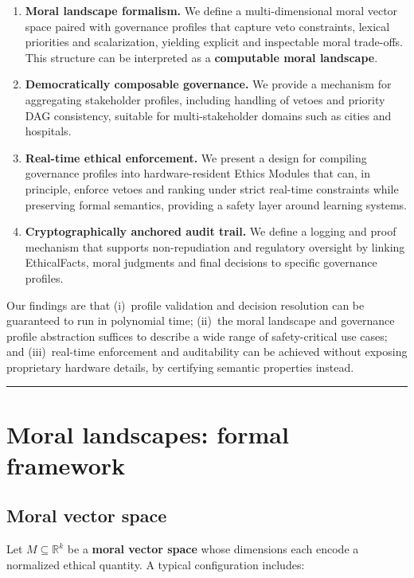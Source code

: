 \documentclass[11pt]{article}
\begin{document}
\begin{enumerate}
  \item \textbf{Moral landscape formalism.} We define a multi-dimensional moral vector space paired with governance profiles that capture veto constraints, lexical priorities and scalarization, yielding explicit and inspectable moral trade-offs. This structure can be interpreted as a \textbf{computable moral landscape}.
  \item \textbf{Democratically composable governance.} We provide a mechanism for aggregating stakeholder profiles, including handling of vetoes and priority DAG consistency, suitable for multi-stakeholder domains such as cities and hospitals.
  \item \textbf{Real-time ethical enforcement.} We present a design for compiling governance profiles into hardware-resident Ethics Modules that can, in principle, enforce vetoes and ranking under strict real-time constraints while preserving formal semantics, providing a safety layer around learning systems.
  \item \textbf{Cryptographically anchored audit trail.} We define a logging and proof mechanism that supports non-repudiation and regulatory oversight by linking EthicalFacts, moral judgments and final decisions to specific governance profiles.
\end{enumerate}

Our findings are that (i)~profile validation and decision resolution can be guaranteed to run in polynomial time; (ii)~the moral landscape and governance profile abstraction suffices to describe a wide range of safety-critical use cases; and (iii)~real-time enforcement and auditability can be achieved without exposing proprietary hardware details, by certifying semantic properties instead.

\hrule
\vspace{1em}

\section{Moral landscapes: formal framework}

\subsection{Moral vector space}

Let $M \subseteq \mathbb{R}^k$ be a \textbf{moral vector space} whose dimensions each encode a normalized ethical quantity. A typical configuration includes:
\end{document}
